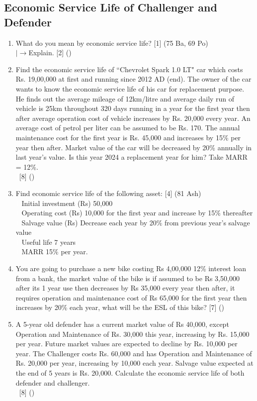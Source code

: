 \documentclass[12pt]{article}
\newcommand{\lb}{\\ $\left|\rightarrow\right.$}
\newcommand{\enter}{\\\textcolor{white}{1}}
\begin{document}
	\subsection{Economic Service Life of Challenger and Defender}
		\begin{enumerate}
			\item What do you mean by economic service life? \hfill [1] (75 Ba, 69 Po)
			\lb Explain. \hfill [2] ()

			\item Find the economic service life of ``Chevrolet Spark 1.0 LT" car which costs Rs. 19,00,000 at first and running since 2012 AD (end). The owner of the car wants to know the economic service life of his car for replacement purpose. He finds out the average mileage of 12km/litre and average daily run of vehicle is 25km throughout 320 days running in a year for the first year then after average operation cost of vehicle increases by Rs. 20,000 every year. An average cost of petrol per liter can be assumed to be Rs. 170. The annual maintenance cost for the first year is Rs. 45,000 and increases by 15\% per year then after. Market value of the car will be decreased by 20\% annually in last year's value. Is this year 2024 a replacement year for him? Take MARR = 12\%. 
			\enter\hfill [8] ()
				
			\item Find economic service life of the following asset: \hfill [4] (81 Ash) \enter
			Initial investment (Rs) 50,000 \enter
			Operating cost (Rs) 10,000 for the first year and increase by 15\% thereafter \enter
			Salvage value (Rs) Decrease each year by 20\% from previous year's salvage value \enter
			Useful life 7 years \enter
			MARR 15\% per year.

			\item You are going to purchase a new bike costing Rs 4,00,000 12\% interest loan from a bank, the market value of the bike is if assumed to be Rs 3,50,000 after its 1 year use then decreases by Rs 35,000 every year then after, it requires operation and maintenance cost of Rs 65,000 for the first year then increases by 20\% each year, what will be the ESL of this bike? \hfill [7] ()

			\item A 5-year old defender has a current market value of Rs 40,000, except Operation and Maintenance of Rs. 30,000 this year, increasing by Rs. 15,000 per year. Future market values are expected to decline by Rs. 10,000 per year. The Challenger costs Rs. 60,000 and has Operation and Maintenance of Rs. 20,000 per year, increasing by 10,000 each year. Salvage value expected at the end of 5 years is Rs. 20,000. Calculate the economic service life of both defender and challenger.
			\enter\hfill [8] ()


\end{enumerate}
\end{document}
